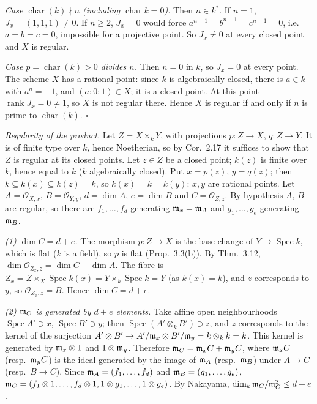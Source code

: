 \documentclass[11pt]{article}
\begin{document}
\emph{Case $\operatorname{char}(k)\nmid n$ (including $\operatorname{char}k=0$).} Then $n\in k^*$. If $n=1$, $J_x=(1,1,1)\ne0$. If $n\ge2$, $J_x=0$ would force $a^{n-1}=b^{n-1}=c^{n-1}=0$, i.e.\ $a=b=c=0$, impossible for a projective point. So $J_x\ne0$ at every closed point and $X$ is regular.

\emph{Case $p=\operatorname{char}(k)>0$ divides $n$.} Then $n=0$ in $k$, so $J_x=0$ at every point. The scheme $X$ has a rational point: since $k$ is algebraically closed, there is $a\in k$ with $a^n=-1$, and $(a:0:1)\in X$; it is a closed point. At this point $\operatorname{rank}J_x=0\ne1$, so $X$ is not regular there. Hence $X$ is regular if and only if $n$ is prime to $\operatorname{char}(k)$. \hfill$\square$

\pf
\emph{Regularity of the product.} Let $Z=X\times_kY$, with projections $p:Z\to X$, $q:Z\to Y$. It is of finite type over $k$, hence Noetherian, so by Cor.~2.17 it suffices to show that $Z$ is regular at its closed points. Let $z\in Z$ be a closed point; $k(z)$ is finite over $k$, hence equal to $k$ ($k$ algebraically closed). Put $x=p(z)$, $y=q(z)$; then $k\subseteq k(x)\subseteq k(z)=k$, so $k(x)=k=k(y)$: $x,y$ are rational points. Let $A=\mathcal O_{X,x}$, $B=\mathcal O_{Y,y}$, $d=\dim A$, $e=\dim B$ and $C=\mathcal O_{Z,z}$. By hypothesis $A$, $B$ are regular, so there are $f_1,\dots,f_d$ generating $\mathfrak m_x=\mathfrak m_A$ and $g_1,\dots,g_e$ generating $\mathfrak m_B$.

\emph{(1) $\dim C=d+e$.} The morphism $p:Z\to X$ is the base change of $Y\to\operatorname{Spec}k$, which is flat ($k$ is a field), so $p$ is flat (Prop.~3.3(b)). By Thm.~3.12, $\dim\mathcal O_{Z_x,z}=\dim C-\dim A$. The fibre is $Z_x=Z\times_X\operatorname{Spec}k(x)=Y\times_k\operatorname{Spec}k=Y$ (as $k(x)=k$), and $z$ corresponds to $y$, so $\mathcal O_{Z_x,z}=B$. Hence $\dim C=d+e$.

\emph{(2) $\mathfrak m_C$ is generated by $d+e$ elements.} Take affine open neighbourhoods $\operatorname{Spec}A'\ni x$, $\operatorname{Spec}B'\ni y$; then $\operatorname{Spec}(A'\otimes_kB')\ni z$, and $z$ corresponds to the kernel of the surjection $A'\otimes B'\to A'/\mathfrak m_x\otimes B'/\mathfrak m_y=k\otimes_kk=k$. This kernel is generated by $\mathfrak m_x\otimes1$ and $1\otimes\mathfrak m_y$. Therefore $\mathfrak m_C=\mathfrak m_xC+\mathfrak m_yC$, where $\mathfrak m_xC$ (resp.\ $\mathfrak m_yC$) is the ideal generated by the image of $\mathfrak m_A$ (resp.\ $\mathfrak m_B$) under $A\to C$ (resp.\ $B\to C$). Since $\mathfrak m_A=(f_1,\dots,f_d)$ and $\mathfrak m_B=(g_1,\dots,g_e)$, $\mathfrak m_C=(f_1\otimes1,\dots,f_d\otimes1,1\otimes g_1,\dots,1\otimes g_e)$. By Nakayama, $\dim_k\mathfrak m_C/\mathfrak m_C^2\le d+e$.
\end{document}
